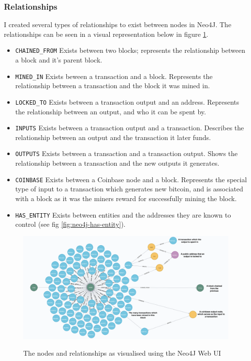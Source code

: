 \subsubsection{Relationships}
I created several types of relationships to exist between nodes in Neo4J. The relationships can be seen in a visual representation below in figure \ref{fig:neo4j-layout}.
\begin{itemize}
    \item \texttt{CHAINED\_FROM} Exists between two blocks; represents the relationship between a block and it's parent block. 
    \item \texttt{MINED\_IN} Exists beween a transaction and a block. Represents the relationship between a transaction and the block it was mined in. 
    \item \texttt{LOCKED\_TO} Exists between a transaction output and an address. Represents the relationship between an output, and who it can be spent by. 
    \item \texttt{INPUTS} Exists between a transaction output and a transaction. Describes the relationship between an output and the transaction it later funds. 
    \item \texttt{OUTPUTS} Exists between a transaction and a transaction output. Shows the relationship between a transaction and the new outputs it generates. 
    \item \texttt{COINBASE} Exists between a Coinbase node and a block. Represents the special type of input to a transaction which generates new bitcoin, and is associated with a block as it was the miners reward for successfully mining the block. 
    \item \texttt{HAS\_ENTITY} Exists between entities and the addresses they are known to control (see fig \ref{fig:neo4j-has-entity}).
\end{itemize}

\begin{figure}[h!]
  \centering
  \includegraphics[width = 15cm]{./figures/neo4j-annotated}\\[0.5cm] 
  \caption{The nodes and relationships as visualised using the Neo4J Web UI}
  \label{fig:neo4j-layout}
\end{figure}

